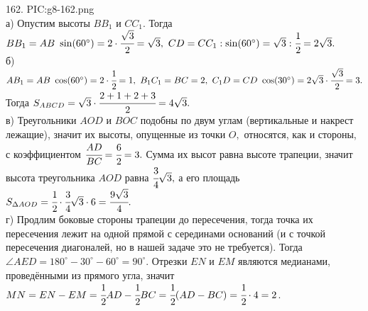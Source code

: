 162. {{PIC:g8-162.png}}\\
а) Опустим высоты $BB_1$ и $CC_1.$ Тогда $BB_1=AB\ \sin(60^\circ)=2\cdot \cfrac{\sqrt{3}}{2}=\sqrt{3},\ CD=CC_1:\sin(60^\circ)=\sqrt{3}:\cfrac{1}{2}=2\sqrt{3}.$\\
б) $AB_1=AB\ \cos(60^\circ)=2 \cdot \cfrac{1}{2}=1,\ B_1C_1=BC=2,\ C_1D=CD\ \cos(30^\circ)=2\sqrt{3}\cdot \cfrac{\sqrt{3}}{2}=3.$ Тогда $S_{ABCD}=\sqrt{3}\cdot\cfrac{2+1+2+3}{2}=4\sqrt{3}.$\\
в) Треугольники $AOD$ и $BOC$ подобны по двум углам (вертикальные и накрест лежащие), значит их высоты, опущенные из точки $O,$ относятся, как и стороны, с коэффициентом $\cfrac{AD}{BC}=\cfrac{6}{2}=3.$ Сумма их высот равна высоте трапеции, значит высота треугольника $AOD$ равна $\cfrac{3}{4}\sqrt{3},$ а его площадь $S_{\Delta AOD}=\cfrac{1}{2}\cdot\cfrac{3}{4}\sqrt{3}\cdot6=\cfrac{9\sqrt{3}}{4}.$\\
г) Продлим боковые стороны трапеции до пересечения, тогда точка их пересечения лежит на одной прямой с серединами оснований (и с точкой пересечения диагоналей, но в нашей задаче это не требуется). Тогда $\angle AED=180^\circ-30^\circ-60^\circ=90^\circ.$ Отрезки $EN$ и $EM$ являются медианами, проведёнными из прямого угла, значит $MN=EN-EM=\cfrac{1}{2}AD-\cfrac{1}{2}BC=\cfrac{1}{2}(AD-BC)=\cfrac{1}{2}\cdot4=2$.\\
